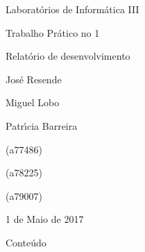 \documentclass[a4paper,portrait,12pt]{article}
\begin{document}
\begin{flushleft}
Laboratórios de Informática III
\end{flushleft}


\begin{flushleft}
Trabalho Prático no 1
\end{flushleft}


\begin{flushleft}
Relatório de desenvolvimento
\end{flushleft}





\begin{flushleft}
José Resende
\end{flushleft}





\begin{flushleft}
Miguel Lobo
\end{flushleft}





\begin{flushleft}
Patr\i{}́cia Barreira
\end{flushleft}





\begin{flushleft}
(a77486)
\end{flushleft}





\begin{flushleft}
(a78225)
\end{flushleft}





\begin{flushleft}
(a79007)
\end{flushleft}





\begin{flushleft}
1 de Maio de 2017
\end{flushleft}





\begin{flushleft}
\newpage
Conteúdo
\end{flushleft}
\end{document}
